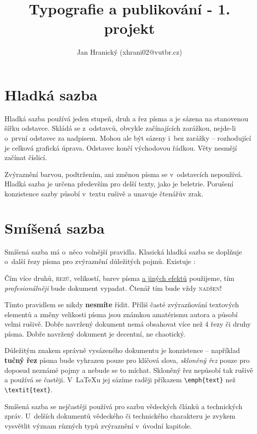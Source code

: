 \documentclass[10pt,a4paper,twocolumn]{article}
\title{Typografie a publikování - 1. projekt}
\author{Jan Hranický (xhrani02@vutbr.cz)}
\date{}
\begin{document}
\maketitle

\section{Hladká sazba}
Hladká sazba používá jeden stupeň, druh a řez písma a je sázena na stanovenou šířku odstavce. Skládá se z~odstavců, obvykle začínajících zarážkou, nejde-li o~první odstavec za nadpisem. Mohou ale být sázeny i~bez zarážky -- rozhodující je celková grafická úprava. Odstavec končí východovou řádkou. Věty nesmějí začínat číslicí.

Zvýraznění barvou, podtržením, ani změnou písma se v~odstavcích nepoužívá. Hladká sazba je určena především pro delší texty, jako je beletrie. Porušení konzistence sazby působí v~textu rušivě a unavuje čtenářův zrak.

\section{Smíšená sazba}
Smíšená sazba má o~něco volnější pravidla. Klasická hladká sazba se doplňuje o~další řezy písma pro zvýraznění důležitých pojmů. Existuje :

\begin{adjustwidth}{0.8cm}{0.7cm}
{\selectfont Čím více druhů,} \textsc{řezů,} {\scriptsize velikostí}, barev písma \underline{a jiných efektů} použijeme, tím {\large \textit{profesionálněji}} bude dokument vypadat. Čtenář tím bude vždy \textsc{nadšen!}
\end{adjustwidth}

{\scriptsize Tímto} pravidlem se nikdy \textbf{nesmíte} řídit. Příliš časté {\large zvýrazňování} textových elementů a změny velikosti {\huge písma} jsou známkou amatérismu autora a působí {\Huge velmi} rušivě. Dobře navržený dokument nemá obsahovat více než
4 řezy či druhy písma. Dobře navržený dokument je decentní, ne chaotický.

Důležitým znakem správně vysázeného dokumentu je konzistence -- například \textbf{tučný řez} písma bude vyhrazen pouze pro klíčová slova, \textsl{skloněný řez} pouze pro doposud neznámé pojmy a nebude se to míchat. Skloněný řez nepůsobí tak rušivě a používá se častěji. V~{\LaTeX}u jej sázíme raději příkazem \verb|\emph{text}| než \verb|\textit{text}|.

Smíšená sazba se nejčastěji používá pro sazbu vědeckých článků a technických zpráv. U~delších dokumentů vědeckého či technického charakteru je zvykem vysvětlit význam různých typů zvýraznění v~úvodní kapitole.
\end{document}
